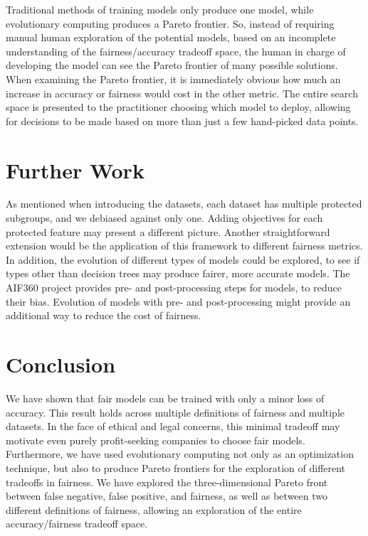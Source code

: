 \documentclass[twoside]{article}
\begin{document}
Traditional methods of training models only produce one model, while evolutionary computing produces a Pareto frontier. So, instead of requiring manual human exploration of the potential models, based on an incomplete understanding of the fairness/accuracy tradeoff space, the human in charge of developing the model can see the Pareto frontier of many possible solutions. When examining the Pareto frontier, it is immediately obvious how much an increase in accuracy or fairness would cost in the other metric. The entire search space is presented to the practitioner choosing which model to deploy, allowing for decisions to be made based on more than just a few hand-picked data points.

\section{Further Work}
As mentioned when introducing the datasets, each dataset has multiple protected subgroups, and we debiased against only one. Adding objectives for each protected feature may present a different picture. Another straightforward extension would be the application of this framework to different fairness metrics. In addition, the evolution of different types of models could be explored, to see if types other than decision trees may produce fairer, more accurate models. The AIF360 project provides pre- and post-processing steps for models, to reduce their bias. Evolution of models with pre- and post-processing might provide an additional way to reduce the cost of fairness.

\section{Conclusion}
We have shown that fair models can be trained with only a minor loss of accuracy. This result holds across multiple definitions of fairness and multiple datasets. In the face of ethical and legal concerns, this minimal tradeoff may motivate even purely profit-seeking companies to choose fair models. Furthermore, we have used evolutionary computing not only as an optimization technique, but also to produce Pareto frontiers for the exploration of different tradeoffs in fairness. We have explored the three-dimensional Pareto front between false negative, false positive, and fairness, as well as between two different definitions of fairness, allowing an exploration of the entire accuracy/fairness tradeoff space.
 



\end{document}
